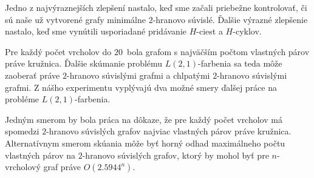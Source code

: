 Jedno z najvýraznejších zlepšení nastalo, keď sme začali priebežne kontrolovať, či sú naše už
vytvorené grafy minimálne $2$-hranovo súvislé. Ďalšie výrazné zlepšenie nastalo, keď sme
vynútili usporiadané pridávanie $H$-ciest a $H$-cyklov.

Pre každý počet vrcholov do $20$ bola grafom s najväčším počtom vlastných párov práve
kružnica. Ďalšie skúmanie problému $L(2,1)$-farbenia sa teda môže zaoberať práve
$2$-hranovo súvislými grafmi a chlpatými $2$-hranovo súvislými grafmi. Z nášho experimentu
vyplývajú dva možné smery ďalšej práce na probléme $L(2,1)$-farbenia.

Jedným smerom by
bola práca na dôkaze, že pre každý počet vrcholov má spomedzi $2$-hranovo súvislých grafov
najviac vlastných párov práve kružnica. Alternatívnym smerom skúania môže byť horný odhad
maximálneho počtu vlastných párov na $2$-hranovo súvislých grafov, ktorý by mohol byť
pre $n$-vrcholový graf práve $O(2.5944^n)$.
